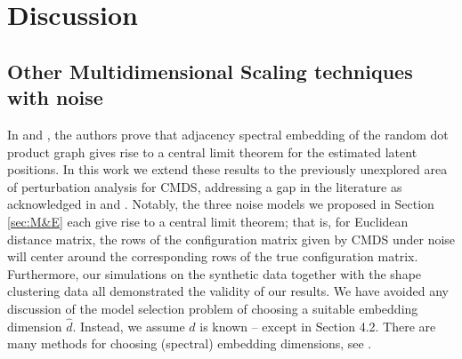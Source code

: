 \chapter{Discussion}
\label{sec:diss}

\section{Other Multidimensional Scaling techniques with noise}
\label{D}

In \citet{Athreya2016} and \citet{OMNI}, the authors prove that adjacency spectral embedding of the random dot product graph gives rise to a central limit theorem for the estimated latent positions. In this work we extend these results to the previously unexplored area of perturbation analysis for CMDS, addressing a gap in the literature as acknowledged in \citet{Fan} and \citet{Peterfreund&Gavish}. Notably, the three noise models we proposed in Section \ref{sec:M&E} each give rise to a central limit theorem; that is, for Euclidean distance matrix, the rows of the configuration matrix given by CMDS under noise will center around the corresponding rows of the true configuration matrix. Furthermore, our simulations on the synthetic data together with the shape clustering data all demonstrated the validity of our results. We have avoided any discussion of the model selection problem of choosing a suitable embedding dimension $\hat{d}$. Instead, we assume $d$ is known -- except in Section 4.2. There are many methods for choosing (spectral) embedding dimensions, see \cite{Zhu&Ghodsi, Jackson, Chatterjee}. 

